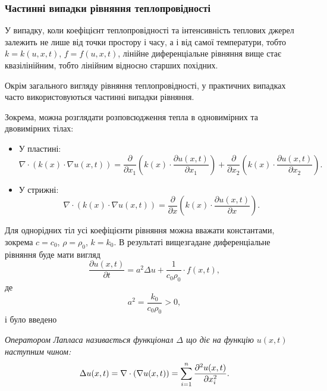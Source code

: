 \subsubsection{Частинні випадки рівняння теплопровідності}

\begin{remark}
	У випадку, коли коефіцієнт теплопровідності та інтенсивність теплових джерел залежить не лише від точки простору і часу, а і від самої температури, тобто $k = k(u, x, t)$, $f = f(u, x, t)$, лінійне диференціальне рівняння вище стає квазілінійним, тобто лінійним відносно старших похідних.
\end{remark}

Окрім загального вигляду рівняння теплопровідності, у практичних випадках часто використовуються частинні випадки рівняння. \medskip

Зокрема, можна розглядати розповсюдження тепла в одновимірних та двовимірних тілах:
\begin{itemize}
	\item У пластині:
	\begin{equation}
		\nabla \cdot (k(x) \cdot \nabla u(x, t)) = \frac{\partial}{\partial x_1} \left( k(x) \cdot \frac{\partial u(x, t)}{\partial x_1} \right) + \frac{\partial}{\partial x_2} \left( k(x) \cdot \frac{\partial u(x, t)}{\partial x_2} \right).
	\end{equation}
	\item У стрижні:
	\begin{equation}
		\nabla \cdot (k(x) \cdot \nabla u(x, t)) = \frac{\partial}{\partial x} \left( k(x) \cdot \frac{\partial u(x, t)}{\partial x} \right).
	\end{equation}
\end{itemize}

Для однорідних тіл усі коефіцієнти рівняння можна вважати константами, зокрема $c = c_0$, $\rho = \rho_0$, $k = k_0$. В результаті вищезгадане диференціальне рівняння буде мати вигляд
\begin{equation}
	\frac{\partial u(x, t)}{\partial t} = a^2 \Delta u + \frac{1}{c_0 \rho_0} \cdot f(x, t),
\end{equation}
де 
\begin{equation}
	a^2 = \frac{k_0}{c_0 \rho_0} > 0,
\end{equation}
і було введено
\begin{definition}
	\it{Оператором Лапласа} називається функціонал $\Delta$ що діє на функцію $u(x, t)$ наступним чином:
	\begin{equation}
		\Delta u(x, t) = \nabla \cdot (\nabla u(x, t)) = \displaystyle\sum\limits_{i = 1}^n \frac{\partial^2 u(x, t)}{\partial x_i^2}.
	\end{equation}
\end{definition}

